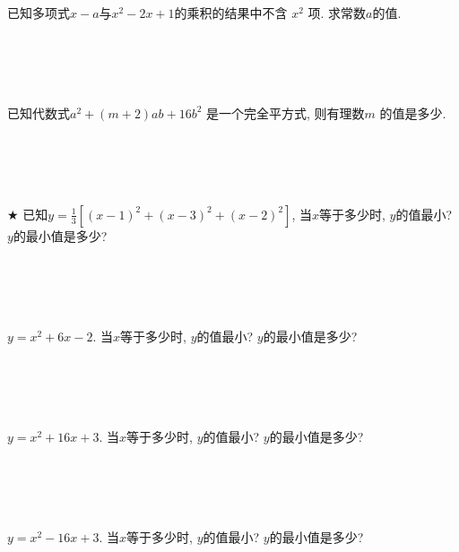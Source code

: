 \item {
    已知多项式$x-a$与$x^2 - 2x + 1$的乘积的结果中不含 $x^2$ 项. 求常数$a$的值. 
    \ifshowSolution
        \fangsong{}
        \\
    \else
        \\ \\ \\ \\ 
    \fi
}

\item {
    已知代数式$a^2 + (m+2)ab+ 16b^2$ 是一个完全平方式, 则有理数$m$ 的值是多少. 
    \ifshowSolution
        \fangsong{}
        \\
    \else
        \\ \\ \\ \\ 
    \fi
}

\item {
    $\bigstar$
    已知$y=\frac13 [(x - 1)^2 + (x - 3)^2 + (x - 2)^2]$, 当$x$等于多少时, $y$的值最小? $y$的最小值是多少? 
    \ifshowSolution
        \fangsong{}
        \\
    \else
        \\ \\ \\ \\ 
    \fi
}

\item {
    $y=x^2 + 6x - 2$. 当$x$等于多少时, $y$的值最小? $y$的最小值是多少? 
    \ifshowSolution
        \fangsong{}
        \\
    \else
        \\ \\ \\ \\ 
    \fi
}

\item {
    $y=x^2 + 16x + 3$. 当$x$等于多少时, $y$的值最小? $y$的最小值是多少? 
    \ifshowSolution
        \fangsong{}
        \\
    \else
        \\ \\ \\ \\ 
    \fi
}

\item {
    $y=x^2 - 16x + 3$. 当$x$等于多少时, $y$的值最小? $y$的最小值是多少? 
    \ifshowSolution
        \fangsong{}
        \\
    \else
        \\ \\ \\ \\ 
    \fi
}